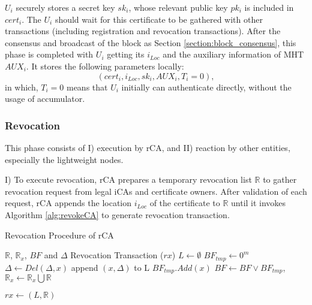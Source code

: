 \documentclass[conference]{IEEEtran}
\begin{document}
$U_i$ securely stores a secret key $sk_i$, whose relevant public key $pk_i$ is included in $cert_i$. The $U_i$ should wait for this certificate to be gathered with other transactions (including registration and revocation transactions). After the consensus and broadcast of the block as Section \ref{section:block_consensus}, this phase is completed with $U_i$ getting its $i_{Loc}$ and the auxiliary information of MHT $AUX_i$. It stores the following parameters locally:
$$(cert_i, i_{Loc}, sk_i, AUX_i, T_i = 0),$$
in which, $T_i = 0$ means that $U_i$ initially can authenticate directly, without the usage of accumulator.


\subsubsection{Revocation} \label{sec:revoke}
This phase consists of I) execution by rCA, and II) reaction by other entities, especially the lightweight nodes. 

I) To execute revocation, rCA prepares a temporary revocation list $\mathbb{R}$ to gather revocation request from legal iCAs and certificate owners. After validation of each request, rCA appends the location $i_{Loc}$ of the certificate to $\mathbb{R}$ until it invokes Algorithm \ref{alg:revokeCA} to generate revocation transaction. 



\begin{algorithm}[h]
\renewcommand{\algorithmicensure}{\textbf{Output:}}
	\caption{Revocation Procedure of rCA}\label{alg:revokeCA}
	\begin{algorithmic}[1]
		\Require $\mathbb{R}$, $\mathbb{R}_x$, $BF$ and $\Delta$ %
		\Ensure Revocation Transaction ($rx$)
		\State $L\gets \emptyset$
		\State $BF_{tmp} \gets 0^m$ 
		\State $\Delta \gets Del(\Delta, x)$ 
		\State append $(x, \Delta)$ to L
		\Else
		\State $BF_{tmp}.Add(x)$ %
		\EndIf
		\EndFor
		\State $BF \gets BF \lor BF_{tmp}$, $\mathbb{R}_x \gets \mathbb{R}_x \bigcup \mathbb{R} $
		
		\Return $rx \gets (L, \mathbb{R})$
	\end{algorithmic}
\end{algorithm}
\end{document}
